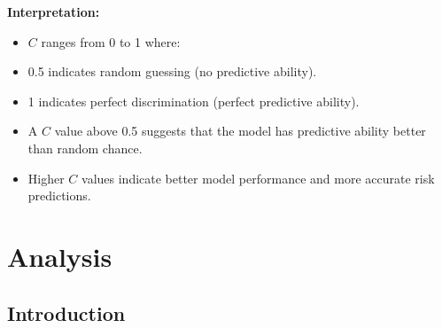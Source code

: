 \documentclass[12pt]{report}
\begin{document}
\textbf{Interpretation:}
\begin{itemize}
    \item \( C \) ranges from 0 to 1 where:
    \item 0.5 indicates random guessing (no predictive ability).
    \item 1 indicates perfect discrimination (perfect predictive ability).
    \item A \( C \) value above 0.5 suggests that the model has predictive ability better than random chance.
    \item Higher \( C \) values indicate better model performance and more accurate risk predictions.
\end{itemize}

\chapter{Analysis}

\section{Introduction}

\end{document}
